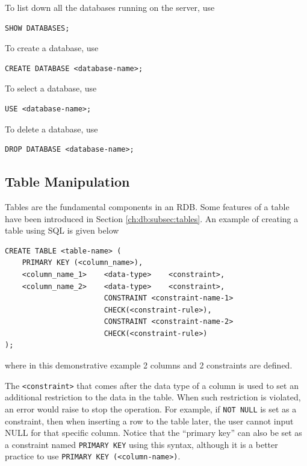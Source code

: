 To list down all the databases running on the server, use
\begin{lstlisting}
SHOW DATABASES;
\end{lstlisting}
To create a database, use
\begin{lstlisting}
CREATE DATABASE <database-name>;
\end{lstlisting}
To select a database, use
\begin{lstlisting}
USE <database-name>;
\end{lstlisting}
To delete a database, use
\begin{lstlisting}
DROP DATABASE <database-name>;
\end{lstlisting}

\subsection{Table Manipulation}

Tables are the fundamental components in an RDB. Some features of a table have been introduced in Section \ref{ch:db:subsec:tables}. An example of creating a table using SQL is given below
\begin{lstlisting}
CREATE TABLE <table-name> (
    PRIMARY KEY (<column_name>),
    <column_name_1>    <data-type>    <constraint>,
    <column_name_2>    <data-type>    <constraint>,
                       CONSTRAINT <constraint-name-1>
                       CHECK(<constraint-rule>),
                       CONSTRAINT <constraint-name-2>
                       CHECK(<constraint-rule>)
);
\end{lstlisting}
where in this demonstrative example 2 columns and 2 constraints are defined.

The \verb|<constraint>| that comes after the data type of a column is used to set an additional restriction to the data in the table. When such restriction is violated, an error would raise to stop the operation. For example, if \verb|NOT NULL| is set as a constraint, then when inserting a row to the table later, the user cannot input NULL for that specific column. Notice that the ``primary key'' can also be set as a constraint named \verb|PRIMARY KEY| using this syntax, although it is a better practice to use \verb|PRIMARY KEY (<column-name>)|.

